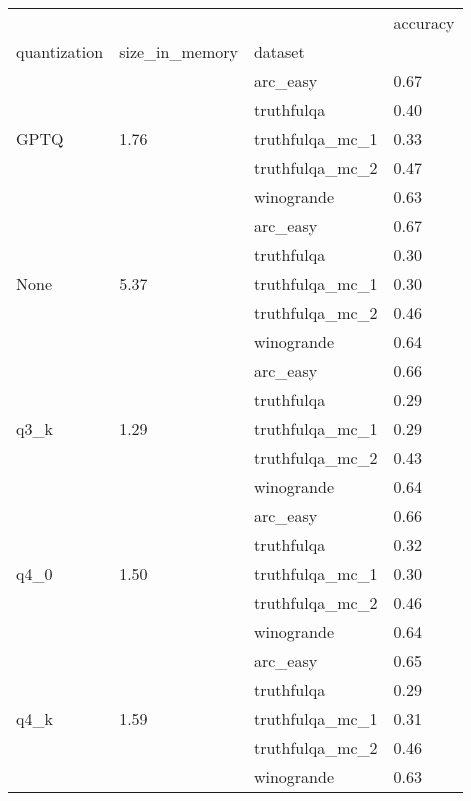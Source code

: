\begin{tabular}{llll}
\toprule
 &  &  & accuracy \\
quantization & size\_in\_memory & dataset &  \\
\midrule
\multirow[t]{5}{*}{GPTQ} & \multirow[t]{5}{*}{1.76} & arc\_easy & 0.67 \\
 &  & truthfulqa & 0.40 \\
 &  & truthfulqa\_mc\_1 & 0.33 \\
 &  & truthfulqa\_mc\_2 & 0.47 \\
 &  & winogrande & 0.63 \\
\cline{1-4} \cline{2-4}
\multirow[t]{5}{*}{None} & \multirow[t]{5}{*}{5.37} & arc\_easy & 0.67 \\
 &  & truthfulqa & 0.30 \\
 &  & truthfulqa\_mc\_1 & 0.30 \\
 &  & truthfulqa\_mc\_2 & 0.46 \\
 &  & winogrande & 0.64 \\
\cline{1-4} \cline{2-4}
\multirow[t]{5}{*}{q3\_k} & \multirow[t]{5}{*}{1.29} & arc\_easy & 0.66 \\
 &  & truthfulqa & 0.29 \\
 &  & truthfulqa\_mc\_1 & 0.29 \\
 &  & truthfulqa\_mc\_2 & 0.43 \\
 &  & winogrande & 0.64 \\
\cline{1-4} \cline{2-4}
\multirow[t]{5}{*}{q4\_0} & \multirow[t]{5}{*}{1.50} & arc\_easy & 0.66 \\
 &  & truthfulqa & 0.32 \\
 &  & truthfulqa\_mc\_1 & 0.30 \\
 &  & truthfulqa\_mc\_2 & 0.46 \\
 &  & winogrande & 0.64 \\
\cline{1-4} \cline{2-4}
\multirow[t]{5}{*}{q4\_k} & \multirow[t]{5}{*}{1.59} & arc\_easy & 0.65 \\
 &  & truthfulqa & 0.29 \\
 &  & truthfulqa\_mc\_1 & 0.31 \\
 &  & truthfulqa\_mc\_2 & 0.46 \\
 &  & winogrande & 0.63 \\
\cline{1-4} \cline{2-4}
\bottomrule
\end{tabular}
